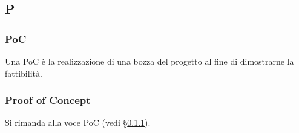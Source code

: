 \subsection{P}

\subsubsection{PoC}
\label{poc}
Una PoC è la realizzazione di una bozza del progetto al fine di dimostrarne la fattibilità.

\subsubsection{Proof of Concept}
Si rimanda alla voce PoC (vedi \S\ref{poc}).

\newpage
